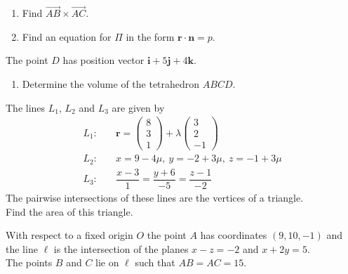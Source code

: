 \documentclass[leqno]{article}
\begin{document}
\begin{enumerate}[
  label=\textbf{\arabic*.},
  leftmargin=*,
  topsep=0pt,
  partopsep=0pt,
  parsep=0pt
]
\begin{enumerate}[label=\textbf{(\alph*)}]
  \item Find $\overrightarrow{AB} \times \overrightarrow{AC}$.  \\
  \item Find an equation for $\Pi$ in the form $\mathbf{r} \cdot \mathbf{n} = p$.  \\
\end{enumerate}
The point $D$ has position vector $\mathbf{i}+5\mathbf{j}+4\mathbf{k}$. \\
\begin{enumerate}[label=\textbf{(\alph*)}, resume]
  \item Determine the volume of the tetrahedron $ABCD$.  \\
\end{enumerate}

\newpage

\questionitem

The lines $L_1$, $L_2$ and $L_3$ are given by
\begin{align*}
L_1: &\quad \mathbf{r}=\begin{pmatrix}8\\3\\1\end{pmatrix}+\lambda\begin{pmatrix}3\\2\\-1\end{pmatrix}\\[6pt]
L_2: &\quad x=9-4\mu,\ y=-2+3\mu,\ z=-1+3\mu\\[6pt]
L_3: &\quad \dfrac{x-3}{1}=\dfrac{y+6}{-5}=\dfrac{z-1}{-2}
\end{align*}
The pairwise intersections of these lines are the vertices of a triangle. \\

Find the area of this triangle. 

\newpage

\questionitem

With respect to a fixed origin $O$ the point $A$ has coordinates $(9,10,-1)$ and the line $\ell$ is the intersection of the planes $x-z=-2$ and $x+2y=5$. \\

The points $B$ and $C$ lie on $\ell$ such that $AB=AC=15$. \\


\end{enumerate}
\end{document}
